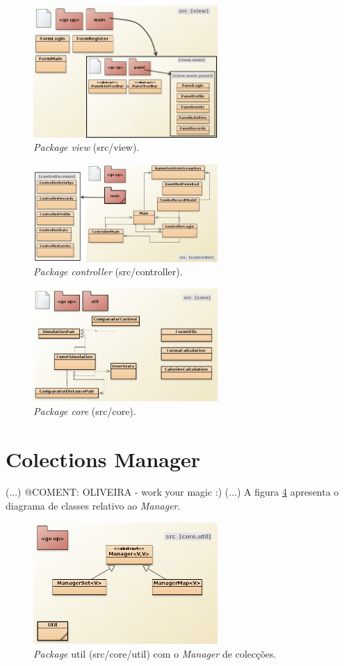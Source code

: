 \documentclass[a4paper,10pt]{report}
\begin{document}
\begin{figure}
\centering
\includegraphics[width=7cm]{view.png}
\caption{\emph{Package view} (src/view).}
\label{fig:view}
\end{figure}

\begin{figure}
\centering
\includegraphics[width=7cm]{controller.png}
\caption{\emph{Package controller} (src/controller).}
\label{fig:controller}
\end{figure}

\begin{figure}
\centering
\includegraphics[width=7cm]{core.png}
\caption{\emph{Package core} (src/core).}
\label{fig:core}
\end{figure}

\section{Colections Manager}
\label{sec:manager}
(...)
@COMENT: OLIVEIRA - work your magic :)
(...)
A figura \ref{fig:manager} apresenta o diagrama de classes relativo ao \emph{Manager}.

\begin{figure}
\centering
\includegraphics[width=7cm]{coreUtil.png}
\caption{\emph{Package} util (src/core/util) com o \emph{Manager} de colecções.}
\label{fig:manager}
\end{figure}
\end{document}
